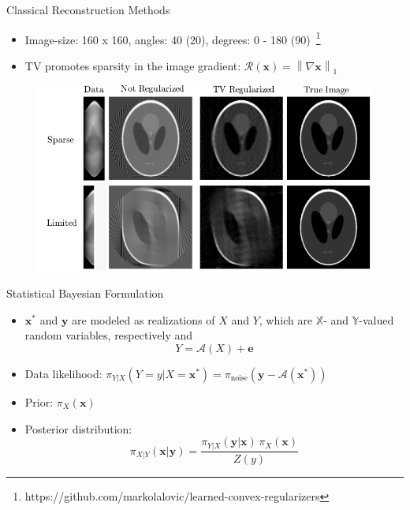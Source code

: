 \documentclass{beamer}
\newcommand{\norm}[1]{\left\lVert#1\right\rVert}
\begin{document}
\begin{frame}{Classical Reconstruction Methods}
\begin{itemize}
\item Image-size: 160 x 160, angles: 40 (20), degrees: 0 - 180 (90)~\footnote{{\tiny \color{blue} https://github.com/markolalovic/learned-convex-regularizers}}
\item TV promotes sparsity in the image gradient: $\mathcal{R}(\pmb{x}) = \norm{\nabla \pmb{x}}_{1}$
\end{itemize}
\begin{center}
\begin{figure}
\includegraphics[width=.91\textwidth]{../figures/methods-annotated-crop.pdf}
\end{figure}
\end{center}
\end{frame}

\begin{frame}{Statistical Bayesian Formulation}
\begin{itemize}
\item $\pmb{x}^{*}$ and $\pmb{y}$ are modeled as realizations of $X$ and $Y$, which are $\mathbb{X}$- and $\mathbb{Y}$-valued random variables, respectively and
$$
Y = \mathcal{A}(X) + \pmb{e}
$$
\item Data likelihood: $\pi_{Y | X} (Y = y | X = \pmb{x}^{*}) = \pi_{\text{noise}}\left(\pmb{y} - \mathcal{A}(\pmb{x}^{*})\right)$
\item Prior: $\pi_{X}(\pmb{x})$
\item Posterior distribution: 
$$\pi_{X | Y}(\pmb{x} | \pmb{y}) = \frac{\pi_{Y | X}(\pmb{y} | \pmb{x}) \, \pi_{X}(\pmb{x})}{Z(y)}$$
\end{itemize}
\end{frame}
\end{document}
